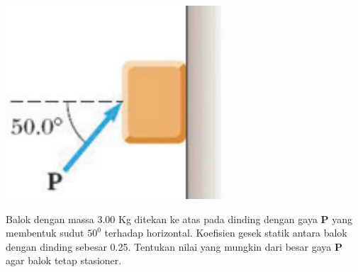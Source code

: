 \begin{center}
\includegraphics [width=\columnwidth]{./latex/eps/1_5_14_image_1-eps-converted-to.pdf}
\end{center}

Balok dengan massa 3.00 Kg ditekan ke atas pada dinding dengan gaya \textbf{P} yang membentuk sudut $50^{0}$ terhadap horizontal. Koefisien gesek statik antara balok dengan dinding sebesar 0.25. Tentukan nilai yang mungkin dari besar gaya \textbf{P} agar balok tetap stasioner.


